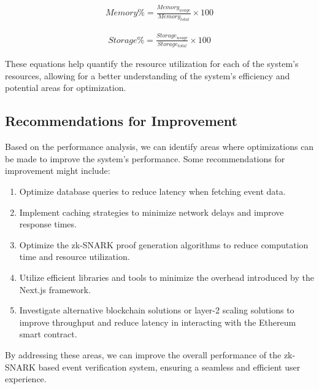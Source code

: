 \begin{align}
Memory\% = \frac{Memory_{usage}}{Memory_{total}} \times 100\label{EqMemory}
\end{align}

\begin{align}
Storage\% = \frac{Storage_{usage}}{Storage_{total}} \times 100\label{EqStorage}
\end{align}

These equations help quantify the resource utilization for each of the system's resources, allowing for a better understanding of the system's efficiency and potential areas for optimization.

\subsection{Recommendations for Improvement}
Based on the performance analysis, we can identify areas where optimizations can be made to improve the system's performance. Some recommendations for improvement might include:

\begin{enumerate}
    \item Optimize database queries to reduce latency when fetching event data.
    \item Implement caching strategies to minimize network delays and improve response times.
    \item Optimize the zk-SNARK proof generation algorithms to reduce computation time and resource utilization.
    \item Utilize efficient libraries and tools to minimize the overhead introduced by the Next.js framework.
    \item Investigate alternative blockchain solutions or layer-2 scaling solutions to improve throughput and reduce latency in interacting with the Ethereum smart contract.
\end{enumerate}

By addressing these areas, we can improve the overall performance of the zk-SNARK based event verification system, ensuring a seamless and efficient user experience.

